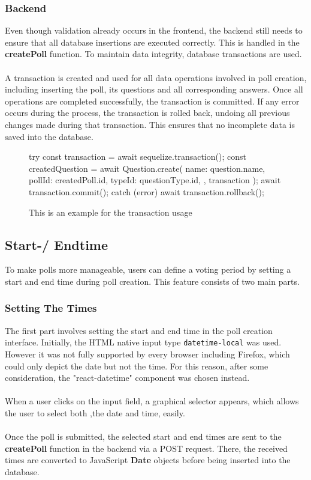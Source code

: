 \documentclass[a4paper,12pt]{report}
\begin{document}
\subsubsection{Backend}
Even though validation already occurs in the frontend, the backend still needs to ensure that all database insertions are executed correctly. This is handled in the \textbf{createPoll} function. To maintain data integrity, database transactions are used.\\\\
A transaction is created and used for all data operations involved in poll creation, including inserting the poll, its questions and all corresponding answers. Once all operations are completed successfully, the transaction is committed. If any error occurs during the process, the transaction is rolled back, undoing all previous changes made during that transaction. This ensures that no incomplete data is saved into the database.
\begin{figure}[H]
	\begin{code}
		try {
			const transaction = await sequelize.transaction();
			const createdQuestion = await Question.create({
				name: question.name,
				pollId: createdPoll.id,
				typeId: questionType.id,
			}, { transaction });
			await transaction.commit();
		} catch (error) {
			await transaction.rollback();
		}
	\end{code}
	\caption{This is an example for the transaction usage}
	\label{fig:example-transaction}
\end{figure} 
\subsection{Start-/ Endtime}
To make polls more manageable, users can define a voting period by setting a start and end time during poll creation. This feature consists of two main parts.
\subsubsection{Setting The Times}
The first part involves setting the start and end time in the poll creation interface. Initially, the HTML native input type \verb|datetime-local| was used. However it was not fully supported by every browser including Firefox, which could only depict the date but not the time. For this reason, after some consideration, the "react-datetime" component was chosen instead.\\\\
When a user clicks on the input field, a graphical selector appears, which allows the user to select both ,the date and time, easily.\\\\
Once the poll is submitted, the selected start and end times are sent to the \textbf{createPoll} function in the backend via a POST request. There, the received times are converted to JavaScript \textbf{Date} objects before being inserted into the database.
\end{document}
